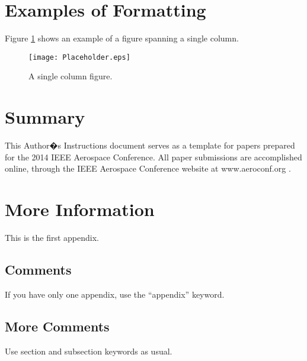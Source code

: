 \documentclass[twocolumn,letterpaper]{IEEEAerospaceCLS}  %
\begin{document}
\section{Examples of Formatting} \label{s:examples}
Figure \ref{OneColumn} shows an example of a figure spanning a single column.

\begin{figure}
\centering
\texttt{[image: Placeholder.eps]}
\caption{A single column figure.}
\label{OneColumn}
\end{figure}


\section{Summary}
This Author�s Instructions document serves as a template for papers prepared for the 2014 IEEE Aerospace Conference. All paper submissions are accomplished online, through the IEEE Aerospace Conference website at www.aeroconf.org \cite{AeroConf}.





\appendices               %

\section{More Information}        %
This is the first appendix. 

\subsection{Comments}
If you have only one appendix, use the ``appendix'' keyword.

\subsection{More Comments}
Use section and subsection keywords as usual.
\end{document}
